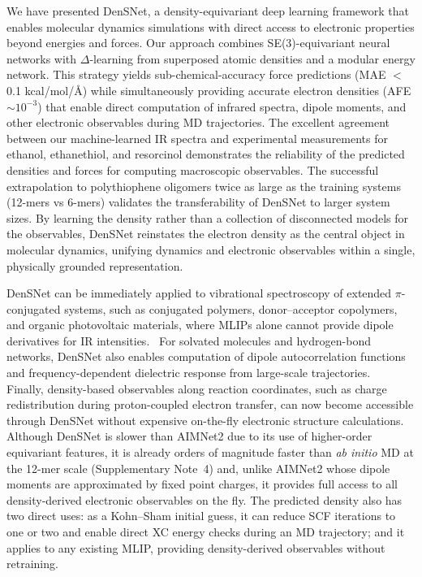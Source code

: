 \documentclass[12pt]{article}
\begin{document}
We have presented DenSNet, a density-equivariant deep learning framework that enables molecular dynamics simulations with direct access to electronic properties beyond energies and forces. Our approach combines SE(3)-equivariant neural networks with $\Delta$-learning from superposed atomic densities and a modular energy network. This strategy yields sub-chemical-accuracy force predictions (MAE $<$ 0.1 kcal/mol/Å) while simultaneously providing accurate electron densities (AFE ${\sim}10^{-3}$) that enable direct computation of infrared spectra, dipole moments, and other electronic observables during MD trajectories. The excellent agreement between our machine-learned IR spectra and experimental measurements for ethanol, ethanethiol, and resorcinol demonstrates the reliability of the predicted densities and forces for computing macroscopic observables. The successful extrapolation to polythiophene oligomers twice as large as the training systems (12-mers vs 6-mers) validates the transferability of DenSNet to larger system sizes.
By learning the density rather than a collection of disconnected models for the observables, DenSNet reinstates the electron density as the central object in molecular dynamics, unifying dynamics and electronic observables within a single, physically grounded representation.

DenSNet can be immediately applied to vibrational spectroscopy of extended $\pi$-conjugated systems, such as conjugated polymers, donor--acceptor copolymers, and organic photovoltaic materials, where MLIPs alone cannot provide dipole derivatives for IR intensities.~\cite{mai2025computing,bhatia2025leveraging} For solvated molecules and hydrogen-bond networks, DenSNet also enables computation of dipole autocorrelation functions and frequency-dependent dielectric response from large-scale trajectories.~\cite{krishnamoorthy2021dielectric} 
Finally, density-based observables along reaction coordinates, such as charge redistribution during proton-coupled electron transfer, can now become accessible through DenSNet without expensive on-the-fly electronic structure calculations.~\cite{hammesschiffer2008proton} Although DenSNet is slower than AIMNet2 due to its use of higher-order equivariant features, it is already orders of magnitude faster than \textit{ab initio} MD at the 12-mer scale (Supplementary Note~4) and, unlike AIMNet2 whose dipole moments are approximated by fixed point charges, it provides full access to all density-derived electronic observables on the fly.
The predicted density also has two direct uses: as a Kohn--Sham initial guess, it can reduce SCF iterations to one or two and enable direct XC energy checks during an MD trajectory; and it applies to any existing MLIP, providing density-derived observables without retraining.
\end{document}
